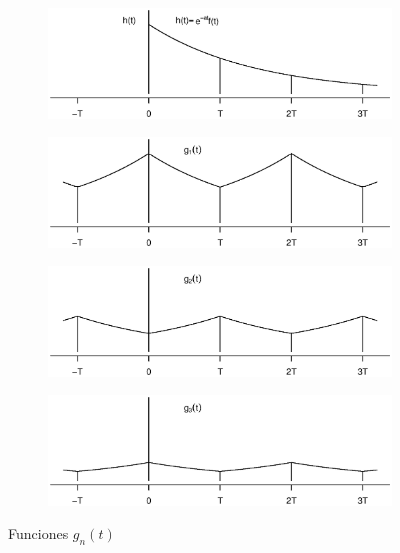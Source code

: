 \documentclass[11pt]{article}
\numberwithin{equation}{section} %
\begin{document}
\begin{figure}[htbp]
\centering

\begin{subfigure}[b]{\textwidth}
\centering
\includegraphics[width=\textwidth,trim=0 1.5cm 0 2.5cm]{ft.eps}
\end{subfigure}

\begin{subfigure}[b]{\textwidth}
\centering
\includegraphics[width=\textwidth,trim=0 1.5cm 0 2.5cm]{g1t.eps}
\end{subfigure}

\begin{subfigure}[b]{\textwidth}
\centering
\includegraphics[width=\textwidth,trim=0 1.5cm 0 2.5cm]{g2t.eps}
\end{subfigure}

\begin{subfigure}[b]{\textwidth}
\centering
\includegraphics[width=\textwidth,trim=0 1.5cm 0 2.5cm]{g3t.eps}
\end{subfigure}

\caption{Funciones $g_n(t)$}
\label{foruier}
\end{figure}
\end{document}
